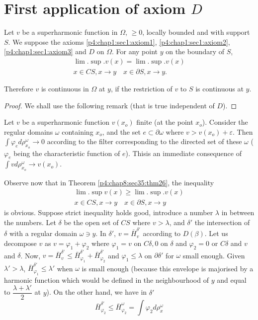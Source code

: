 \section{First application of axiom \texorpdfstring{$D$}{D}}\label{p4:chap8:sec35}%
 
\begin{thm}\label{p4:chap8:sec35:thm26} %
  Let $v$ be a superharmonic function in $\Omega$, $\ge 0$, locally
  bounded and with support $S$. We suppose the axioms
  \ref{p4:chap1:sec1:axiom1}, \ref{p4:chap1:sec1:axiom2},
  \ref{p4:chap1:sec1:axiom3}  and
  $D$ on $\Omega$. For any point $y$  on the boundary of $S$, 
  \begin{gather*}
    \lim. \sup. v(x) = \lim. \sup. v(x)\\
    x \in CS, x \to y \quad x \in \partial S, x \to y.
  \end{gather*}
\end{thm} 
 
Therefore $v$ is continuous in $\Omega$ at $y$, if the restriction of
$v$ to $S$ is continuous at $y$. 
 
\begin{proof} %
  We shall use the following remark (that is true independent of $D$).
\end{proof} 
 
Let $v$ be a superharmonic function $v(x_o)$ finite (at the point
$x_o$). Consider the regular domains $\omega$ containing $x_o$, and the
set $e \subset \partial \omega$ where $v > v (x_o) +
\varepsilon$. Then $\int \varphi_e d \rho^\omega_{x_o} \to 0$
according to the filter corresponding to the directed set of these
$\omega$ ($\varphi_e$ being the characteristic function of $e$). This\pageoriginale is an
immediate consequence of $\int v d \rho^\omega_{x_o} \to v(x_o)$. 

Observe now that in Theorem \ref{p4:chap8:sec35:thm26}, the inequality
\begin{gather*}
  \lim. \sup v(x) \ge \lim. \sup. v(x)\\
  x \in CS, x \to y \quad x \in \partial S, x \to y
\end{gather*}
is obvious. Suppose strict inequality holds good, introduce a number
$\lambda$ in between the numbers. Let $\delta$ be the open set of $CS$
where $v > \lambda$,  and $\delta'$ the intersection of $\delta$ with
a regular domain $\omega \ni y$. In $\delta'$, $v =
\bar{H}_v^{\delta'}$ according to $D (\beta)$. Let us decompose $v$ as
$v = \varphi_1 + \varphi_2$ where $\varphi_1 = v $ on $C \delta, 0$ on
$\delta$ and $\varphi_2 = 0$ or $C \delta$ and $v$ and $\delta$. Now,
$v = \bar{H}^{\delta'}_v \le \bar{H}^{\delta'}_{\varphi_1} +
\bar{H}^{\delta'}_{\varphi_2} $ and $\varphi_1 \le \lambda$ on
$\partial \delta'$ for $\omega$ small enough. Given $\lambda' >
\lambda$, $\bar{H}^{\delta'}_{\varphi_1} \le \lambda'$ when $\omega$
is small enough (because this envelope is majorised by a harmonic
function which would be defined in the neighbourhood of $y $ and equal
to $\dfrac{\lambda + \lambda'}{2}$ at $y$). On the other hand, we have
in $\delta'$ 
$$
\bar{H}^{\delta'}_{\varphi_2} \le \bar{H}^{\omega}_{\varphi_2} =\int
\varphi_2 d \rho^\omega_x 
$$

